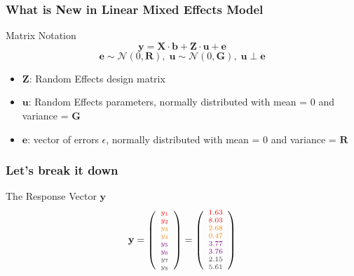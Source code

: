 \documentclass{beamer}
\begin{document}
\begin{frame}
\frametitle{What is New in Linear Mixed Effects Model}
\begin{block}{Matrix Notation}
\[
\mathbf{y} = \mathbf{X} \cdot \mathbf{b} + \mathbf{Z} \cdot \mathbf{u} + \mathbf{e}
\]
\[
\mathbf{e} \sim \mathcal{N}(0, \mathbf{R}), \; \mathbf{u} \sim \mathcal{N}(0, \mathbf{G}), \; \mathbf{u} \; \bot \; \mathbf{e}
\]
\end{block}
\begin{itemize}
    \item $\mathbf{Z}$: Random Effects design matrix
    \item $\mathbf{u}$: Random Effects parameters, normally distributed with mean = 0 and variance = $\mathbf{G}$
    \item $\mathbf{e}$: vector of errors $\epsilon$, normally distributed with mean = 0 and variance = $\mathbf{R}$
\end{itemize}
\end{frame}


\begin{frame}
\frametitle{Let's break it down}

The Response Vector $\mathbf{y}$
\[
\scriptsize{
\mathbf{y} = \left( \begin{array}{c}
\color{red}{y_1} \\
\color{red}{y_2} \\
\color{orange}{y_3} \\
\color{orange}{y_4} \\
\color{violet}{y_5} \\
\color{violet}{y_6} \\
\color{darkgray}{y_7} \\
\color{darkgray}{y_8} 
\end{array}\right) = \left( \begin{array}{c}
\color{red}{1.63} \\
\color{red}{8.03} \\
\color{orange}{2.68} \\
\color{orange}{0.47} \\
\color{violet}{3.77}  \\
\color{violet}{3.76} \\
\color{darkgray}{2.15} \\
\color{darkgray}{5.61} 
\end{array}\right)
}
\]
\end{frame}
\end{document}
